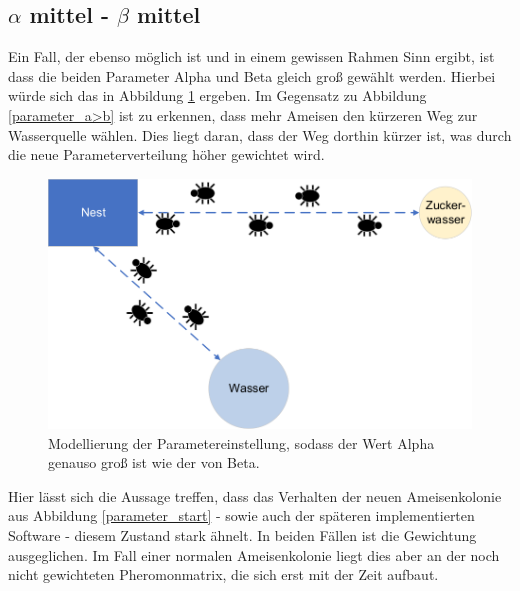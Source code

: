 {	\subsection{$\alpha$ mittel - $\beta$ mittel}
	Ein Fall, der ebenso möglich ist und in einem gewissen Rahmen Sinn ergibt, ist dass die beiden Parameter Alpha und Beta gleich groß gewählt werden. Hierbei würde sich das in Abbildung \ref{parameter_a=b} ergeben. Im Gegensatz zu Abbildung \ref{parameter_a>b} ist zu erkennen, dass mehr Ameisen den kürzeren Weg zur Wasserquelle wählen. Dies liegt daran, dass der Weg dorthin kürzer ist, was durch die neue Parameterverteilung höher gewichtet wird.
	\begin{figure}[h]
		\centering
		\includegraphics[width=0.7\linewidth]{images/AntAlgorithm_alphaEbeta.png}
		\caption{Modellierung der Parametereinstellung, sodass der Wert Alpha genauso groß ist wie der von Beta.}
		\label{parameter_a=b}
	\end{figure}
	Hier lässt sich die Aussage treffen, dass das Verhalten der neuen Ameisenkolonie aus Abbildung \ref{parameter_start} - sowie auch der späteren implementierten Software - diesem Zustand stark ähnelt. In beiden Fällen ist die Gewichtung ausgeglichen. Im Fall einer normalen Ameisenkolonie liegt dies aber an der noch nicht gewichteten Pheromonmatrix, die sich erst mit der Zeit aufbaut. 
	
}
